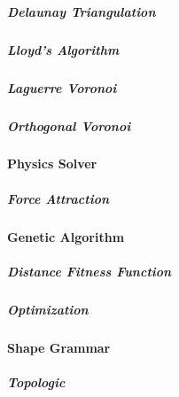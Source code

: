 \documentclass[a4paper,11pt]{report}
\begin{document}
                \lipsum[6-8]
                
                \subparagraph{Delaunay Triangulation}
                
                    \lipsum[6-8]
                    
                \subparagraph{Lloyd's Algorithm}
                
                    \lipsum[6-8]
                    
                \subparagraph{Laguerre Voronoi}
                
                    \lipsum[6-8]
                    
                \subparagraph{Orthogonal Voronoi}
                
                    \lipsum[6-8]
                
            \paragraph{Physics Solver}
        
                \lipsum[6-8]
                
                \subparagraph{Force Attraction}
                
                    \lipsum[6-8]
                
            \paragraph{Genetic Algorithm}
        
                \lipsum[6-8]
                
                \subparagraph{Distance Fitness Function}
                
                    \lipsum[6-8]
                    
                \subparagraph{Optimization}
                
                    \lipsum[6-8]
                
            \paragraph{Shape Grammar}
        
                \lipsum[6-8]
                
                \subparagraph{Topologic}
                
                    \lipsum[6-8]
                    
\end{document}
